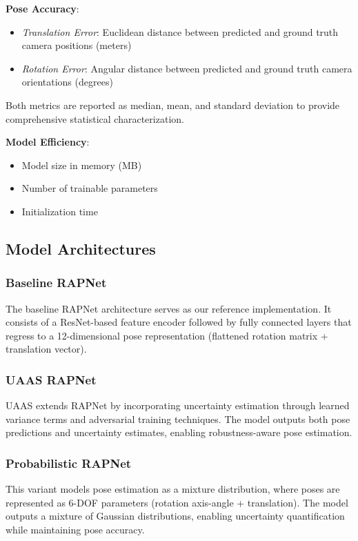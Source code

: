 \documentclass[11pt,a4paper]{article}
\begin{document}
\textbf{Pose Accuracy}: 
\begin{itemize}
    \item \textit{Translation Error}: Euclidean distance between predicted and ground truth camera positions (meters)
    \item \textit{Rotation Error}: Angular distance between predicted and ground truth camera orientations (degrees)
\end{itemize}

Both metrics are reported as median, mean, and standard deviation to provide comprehensive statistical characterization.

\textbf{Model Efficiency}: 
\begin{itemize}
    \item Model size in memory (MB)
    \item Number of trainable parameters
    \item Initialization time
\end{itemize}

\subsection{Model Architectures}

\subsubsection{Baseline RAPNet}
The baseline RAPNet architecture serves as our reference implementation. It consists of a ResNet-based feature encoder followed by fully connected layers that regress to a 12-dimensional pose representation (flattened rotation matrix + translation vector).

\subsubsection{UAAS RAPNet}
UAAS extends RAPNet by incorporating uncertainty estimation through learned variance terms and adversarial training techniques. The model outputs both pose predictions and uncertainty estimates, enabling robustness-aware pose estimation.

\subsubsection{Probabilistic RAPNet}
This variant models pose estimation as a mixture distribution, where poses are represented as 6-DOF parameters (rotation axis-angle + translation). The model outputs a mixture of Gaussian distributions, enabling uncertainty quantification while maintaining pose accuracy.
\end{document}
